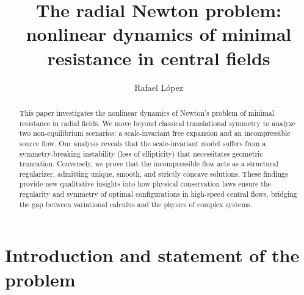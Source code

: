 \documentclass[a4paper,12pt]{amsart}
\theoremstyle{plain}
\theoremstyle{definition}
\begin{document}
\title[The radial Newton problem]{The radial Newton problem: nonlinear dynamics of minimal resistance in central fields}
 


\author[R. L\'opez]{Rafael L\'opez}
\address{Rafael L\'opez \\ Department of Geometry and Topology\\ University of  Granada. 18071 Granada. Spain}

\begin{abstract}
This paper investigates the nonlinear dynamics  of Newton's problem of minimal resistance in radial fields. We move beyond classical translational symmetry to analyze two non-equilibrium scenarios: a scale-invariant free expansion and an incompressible source flow. Our analysis reveals that the scale-invariant model suffers from a symmetry-breaking instability (loss of ellipticity) that necessitates geometric truncation. Conversely, we prove that the incompressible flow acts as a structural regularizer, admitting unique, smooth, and strictly concave solutions. These findings provide new qualitative insights into how physical conservation laws ensure the regularity and symmetry of optimal configurations in high-speed central flows, bridging the gap between variational calculus and the physics of complex systems.\end{abstract}
 

\maketitle

\section{Introduction and statement of the problem}
\end{document}
